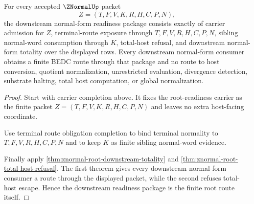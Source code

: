 \begin{theorem}
\label{thm:znormal-downstream-readiness-obligation-package}
For every accepted $\ZNormalUp$ packet
$$
Z=(T,F,V,K,R,H,C,P,N),
$$
the downstream normal-form readiness package consists exactly of carrier admission for $Z$, terminal-route exposure through $T,F,V,R,H,C,P,N$, sibling normal-word consumption through $K$, total-host refusal, and downstream normal-form totality over the displayed rows. Every downstream normal-form consumer obtains a finite BEDC route through that package and no route to host conversion, quotient normalization, unrestricted evaluation, divergence detection, substrate halting, total host computation, or global normalization.
\end{theorem}
\begin{proof}
Start with carrier completion above. It fixes the root-readiness carrier as the finite packet $Z=(T,F,V,K,R,H,C,P,N)$ and leaves no extra host-facing coordinate.

Use terminal route obligation completion to bind terminal normality to $T,F,V,R,H,C,P,N$ and to keep $K$ as finite sibling normal-word evidence.

Finally apply \autoref{thm:znormal-root-downstream-totality} and \autoref{thm:znormal-root-total-host-refusal}. The first theorem gives every downstream normal-form consumer a route through the displayed packet, while the second refuses total-host escape. Hence the downstream readiness package is the finite root route itself.
\end{proof}

